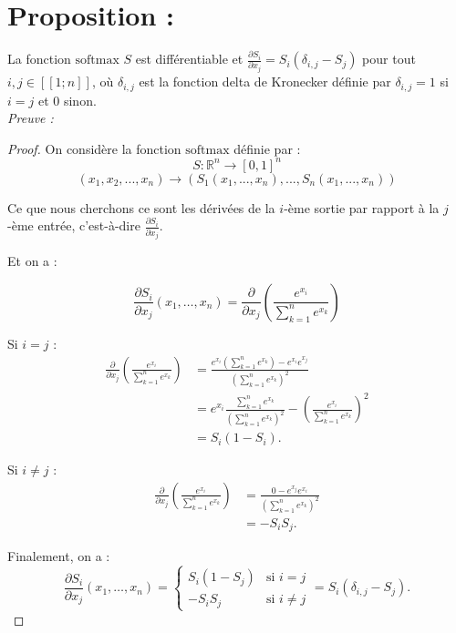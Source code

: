 \documentclass{article}
\begin{document}
\section*{Proposition :}

La fonction $\text{softmax}$ $S$ est différentiable et $\frac{\partial S_i}{\partial x_j} = S_i(\delta_{i,j} - S_j)$ pour tout $i, j \in [\![1; n]\!]$, où $\delta_{i,j}$ est la fonction delta de Kronecker définie par $\delta_{i,j} = 1$ si $i = j$ et $0$ sinon. \\

\textit{Preuve :} 

\begin{proof}
On considère la fonction $\text{softmax}$ définie par :
\[S : \mathbb{R}^n \rightarrow [0,1]^n\]
\[(x_1,x_2,...,x_n) \rightarrow (S_1(x_1,...,x_n),...,S_n(x_1,...,x_n))\]

Ce que nous cherchons ce sont les dérivées de la $i$-ème sortie par rapport à la $j$-ème entrée, c'est-à-dire $\frac{\partial S_i}{\partial x_j}$.

Et on a :

\[
\frac{\partial S_i}{\partial x_j}(x_1, \ldots, x_n) = \frac{\partial}{\partial x_j}\left(\frac{e^{x_i}}{\sum_{k=1}^{n} e^{x_k}}\right)
\]

Si $i=j$ :
\[
\begin{aligned}
    \frac{\partial}{\partial x_j}\left(\frac{e^{x_i}}{\sum_{k=1}^{n} e^{x_k}}\right) &= \frac{e^{x_i}(\sum_{k=1}^{n}e^{x_k}) -e^{x_i}e^{x_j}}{(\sum_{k=1}^{n} e^{x_k})^2} \\
    &= e^{x_i}\frac{\sum_{k=1}^{n}e^{x_k}}{(\sum_{k=1}^{n}e^{x_k})^2} - \left(\frac{e^{x_i}}{\sum_{k=1}^{n}e^{x_k}}\right)^2 \\
    &= S_i(1 - S_i).
\end{aligned}
\]

Si $i \neq j$ :
\[
\begin{aligned}
    \frac{\partial}{\partial x_j}\left(\frac{e^{x_i}}{\sum_{k=1}^{n} e^{x_k}}\right) &= \frac{0 - e^{x_j}e^{x_i}}{(\sum_{k=1}^{n}e^{x_k})^2} \\
    &= -S_iS_j.
\end{aligned}
\]

Finalement, on a :
\[
\frac{\partial S_i}{\partial x_j} (x_1, \ldots, x_n) =
\begin{cases}
    S_i(1-S_j) & \text{si } i = j \\
    -S_iS_j & \text{si } i \neq j
\end{cases} = S_i(\delta_{i,j} - S_j).
\]
\end{proof}
\end{document}
